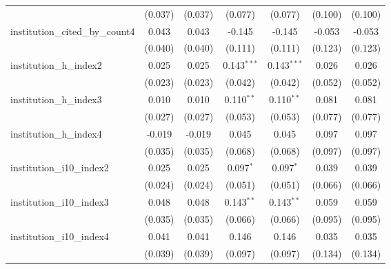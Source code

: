 \begin{tabular}{lcccccc}
                                         & (0.037)        & (0.037)        & (0.077)        & (0.077)        & (0.100)        & (0.100)\\   
   institution\_cited\_by\_count4        & 0.043          & 0.043          & -0.145         & -0.145         & -0.053         & -0.053\\   
                                         & (0.040)        & (0.040)        & (0.111)        & (0.111)        & (0.123)        & (0.123)\\   
   institution\_h\_index2                & 0.025          & 0.025          & 0.143$^{***}$  & 0.143$^{***}$  & 0.026          & 0.026\\   
                                         & (0.023)        & (0.023)        & (0.042)        & (0.042)        & (0.052)        & (0.052)\\   
   institution\_h\_index3                & 0.010          & 0.010          & 0.110$^{**}$   & 0.110$^{**}$   & 0.081          & 0.081\\   
                                         & (0.027)        & (0.027)        & (0.053)        & (0.053)        & (0.077)        & (0.077)\\   
   institution\_h\_index4                & -0.019         & -0.019         & 0.045          & 0.045          & 0.097          & 0.097\\   
                                         & (0.035)        & (0.035)        & (0.068)        & (0.068)        & (0.097)        & (0.097)\\   
   institution\_i10\_index2              & 0.025          & 0.025          & 0.097$^{*}$    & 0.097$^{*}$    & 0.039          & 0.039\\   
                                         & (0.024)        & (0.024)        & (0.051)        & (0.051)        & (0.066)        & (0.066)\\   
   institution\_i10\_index3              & 0.048          & 0.048          & 0.143$^{**}$   & 0.143$^{**}$   & 0.059          & 0.059\\   
                                         & (0.035)        & (0.035)        & (0.066)        & (0.066)        & (0.095)        & (0.095)\\   
   institution\_i10\_index4              & 0.041          & 0.041          & 0.146          & 0.146          & 0.035          & 0.035\\   
                                         & (0.039)        & (0.039)        & (0.097)        & (0.097)        & (0.134)        & (0.134)\\   

\end{tabular}

